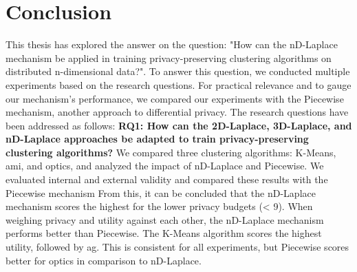 \chapter{Conclusion}
This thesis has explored the answer on the question: "How can the nD-Laplace mechanism be applied in training privacy-preserving clustering algorithms on distributed n-dimensional data?".
To answer this question, we conducted multiple experiments based on the research questions.
For practical relevance and to gauge our mechanism's performance, we compared our experiments with the Piecewise mechanism, another approach to differential privacy.
The research questions have been addressed as follows: \newline
\textbf{RQ1: How can the 2D-Laplace, 3D-Laplace, and nD-Laplace approaches be adapted to train privacy-preserving clustering algorithms?} \newline
We compared three clustering algorithms: K-Means, \gls{ami}, and \gls{optics}, and analyzed the impact of nD-Laplace and Piecewise.
We evaluated internal and external validity and compared these results with the Piecewise mechanism
From this, it can be concluded that the nD-Laplace mechanism scores the highest for the lower privacy budgets (< 9). 
When weighing privacy and utility against each other, the nD-Laplace mechanism performs better than Piecewise. 
The K-Means algorithm scores the highest utility, followed by \gls{ag}. This is consistent for all experiments, but Piecewise scores better for \gls{optics} in comparison to nD-Laplace.
\newline


